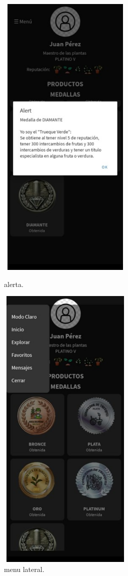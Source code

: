 \documentclass[11pt, a4paper, oneside]{book}
\begin{document}
    \begin{figure}[H]
    \centering
    \begin{minipage}{0.45\textwidth}
        \centering
        \includegraphics[width=6.5cm,height=14cm]{Pictures/reputacion4.jpg}
        \caption{alerta.}
    \end{minipage}
    \hfill
    \begin{minipage}{0.40\textwidth} 
        \centering
        \includegraphics[width=6.5cm,height=14cm]{Pictures/reputacion5.jpg}
        \caption{menu lateral.}
    \end{minipage}
\end{figure}
\end{document}
